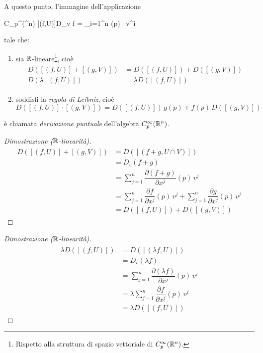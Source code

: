 A questo punto, l'immagine dell'applicazione

%
	{C_{p}^{\infty}(\R^{n})}{\R}%
	{[(f,U)]}{D_{v} f = \sum_{i=1}^{n} \hspace{0px} (p) \, v^{i}}

tale che:

\begin{enumerate}
	\item sia $ \mathbb{R} $-lineare\footnote{%
		Rispetto alla struttura di spazio vettoriale di $ C_{p}^{\infty}(\mathbb{R}^{n}) $.%
	}, cioè
		\begin{align}
			\begin{split}
				D ([(f,U)] + [(g,V)]) &= D ([(f,U)]) + D ([(g,V)])\\
				D (\lambda [(f,U)]) &= \lambda D ([(f,U)])
			\end{split}
		\end{align}
	
	\item soddisfi la \textit{regola di Leibniz}, cioè
		\begin{equation}
			D ([(f,U)] \cdot [(g,V)]) = D ([(f,U)]) \, g(p) + f(p) \, D ([(g,V)])
		\end{equation}
\end{enumerate}

è chiamata \textit{derivazione puntuale} dell'algebra $ C_{p}^{\infty}(\mathbb{R}^{n}) $.

\begin{proof}[Dimostrazione ($ \mathbb{R} $-linearità)]
	\begin{align}
		\begin{split}
			D ([(f,U)] + [(g,V)]) &= D ([(f+g,U \cap V)])\\
			&= D_{v} (f+g)\\
			&= \sum_{j=1}^{n} \dfrac{\partial (f+g)}{\partial x^{j}} (p) \, v^{j}\\
			&= \sum_{j=1}^{n} \dfrac{\partial f}{\partial x^{j}} (p) \, v^{j} + \sum_{j=1}^{n} \dfrac{\partial g}{\partial x^{j}} (p) \, v^{j}\\
			&= D ([(f,U)]) + D ([(g,V)])
		\end{split}
	\end{align}
\end{proof}

\begin{proof}[Dimostrazione ($ \mathbb{R} $-linearità)]
	\begin{align}
		\begin{split}
			\lambda D ([(f,U)]) &= D ([(\lambda f,U)])\\
			&= D_{v} (\lambda f)\\
			&= \sum_{j=1}^{n} \dfrac{\partial (\lambda f)}{\partial x^{j}} (p) \, v^{j}\\
			&= \lambda \sum_{j=1}^{n} \dfrac{\partial f}{\partial x^{j}} (p) \, v^{j}\\
			&= \lambda D ([(f,U)])
		\end{split}
	\end{align}
\end{proof}

